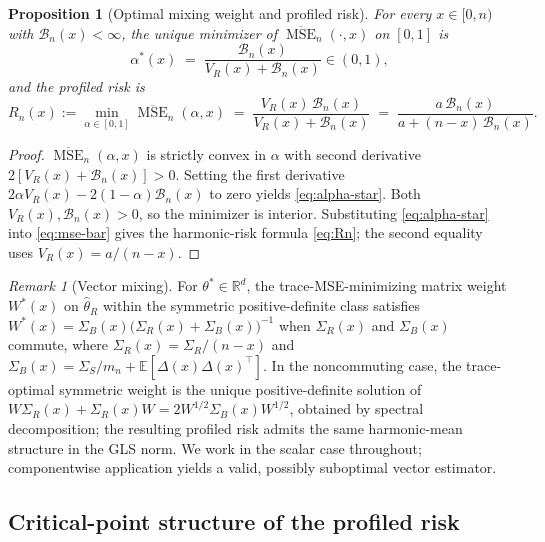 \documentclass[11pt]{article}
\theoremstyle{plain}
\newtheorem{proposition}[theorem]{Proposition}
\theoremstyle{definition}
\theoremstyle{remark}
\newtheorem{remark}[theorem]{Remark}
\newcommand{\R}{\mathbb{R}}
\newcommand{\E}{\mathbb{E}}
\newcommand{\MSE}{\operatorname{MSE}}
\begin{document}
\begin{proposition}[Optimal mixing weight and profiled risk]\label{prop:mix}
For every $x\in[0,n)$ with $\mathcal{B}_n(x)<\infty$, the unique minimizer of $\overline{\MSE}_n(\cdot,x)$ on $[0,1]$ is
\begin{equation}\label{eq:alpha-star}
\alpha^*(x)\;=\;\frac{\mathcal{B}_n(x)}{V_R(x)+\mathcal{B}_n(x)}\in(0,1),
\end{equation}
and the profiled risk is
\begin{equation}\label{eq:Rn}
R_n(x):=\min_{\alpha\in[0,1]}\overline{\MSE}_n(\alpha,x)\;=\;\frac{V_R(x)\,\mathcal{B}_n(x)}{V_R(x)+\mathcal{B}_n(x)}\;=\;\frac{a\,\mathcal{B}_n(x)}{a+(n-x)\,\mathcal{B}_n(x)}.
\end{equation}
\end{proposition}

\begin{proof}
$\overline{\MSE}_n(\alpha,x)$ is strictly convex in $\alpha$ with second derivative $2[V_R(x)+\mathcal{B}_n(x)]>0$. Setting the first derivative $2\alpha V_R(x)-2(1-\alpha)\mathcal{B}_n(x)$ to zero yields \cref{eq:alpha-star}. Both $V_R(x),\mathcal{B}_n(x)>0$, so the minimizer is interior. Substituting \cref{eq:alpha-star} into \cref{eq:mse-bar} gives the harmonic-risk formula \cref{eq:Rn}; the second equality uses $V_R(x)=a/(n-x)$.
\end{proof}

\begin{remark}[Vector mixing]\label{rem:vector-mix}
For $\theta^*\in\R^d$, the trace-MSE-minimizing matrix weight $W^*(x)$ on $\hat\theta_R$ within the symmetric positive-definite class satisfies $W^*(x)=\Sigma_B(x)\bigl(\Sigma_R(x)+\Sigma_B(x)\bigr)^{-1}$ when $\Sigma_R(x)$ and $\Sigma_B(x)$ commute, where $\Sigma_R(x)=\Sigma_R/(n-x)$ and $\Sigma_B(x)=\Sigma_S/m_n+\E[\Delta(x)\Delta(x)^\top]$. In the noncommuting case, the trace-optimal symmetric weight is the unique positive-definite solution of $W\Sigma_R(x)+\Sigma_R(x)W=2W^{1/2}\Sigma_B(x)W^{1/2}$, obtained by spectral decomposition; the resulting profiled risk admits the same harmonic-mean structure in the GLS norm. We work in the scalar case throughout; componentwise application yields a valid, possibly suboptimal vector estimator.
\end{remark}

\subsection{Critical-point structure of the profiled risk}
\label{ssec:critical}
\end{document}
